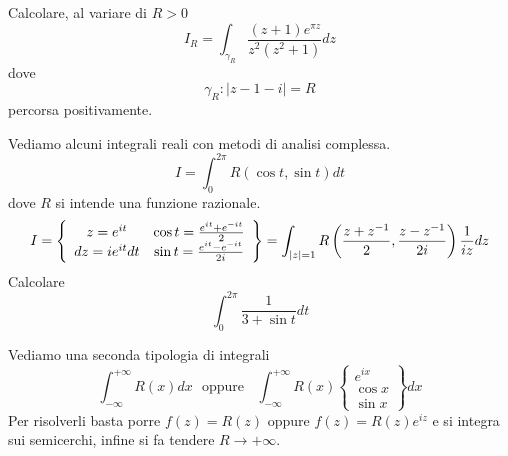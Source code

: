 Calcolare, al variare di $R > 0$
\begin{equation*}
I_{R} = \int _{\gamma _{R}}\frac{\left(z + 1\right) e^{\pi z}}{z^{2}\left(z^{2} + 1\right)} dz
\end{equation*}
dove
\begin{equation*}
\gamma _{R} :\left| z - 1 - i\right| = R
\end{equation*}
percorsa positivamente.
\Esercizio{}

Vediamo alcuni integrali reali con metodi di analisi complessa.
\begin{equation*}
I = \boxed{\int ^{2\pi }_{0} R\left(\cos t,\sin t\right) dt}
\end{equation*}
dove $R$ si intende una funzione razionale.
\begin{equation*}
I = \left\{\begin{array}{ c c }
z = e^{it} & \cos t = \frac{e^{it} + e^{ - it}}{2}\\
dz = ie^{it} dt & \sin t = \frac{e^{it} - e^{ - it}}{2i}
\end{array}\right\} = \int _{\left| z\right| = 1} R\left(\frac{z + z^{ - 1}}{2} ,\frac{z - z^{ - 1}}{2i}\right)\frac{1}{iz} dz
\end{equation*}
Calcolare
\begin{equation*}
\int ^{2\pi }_{0}\frac{1}{3 + \sin t} dt
\end{equation*}
\Esercizio{}

Vediamo una seconda tipologia di integrali
\begin{equation*}
\boxed{\int ^{ + \infty }_{ - \infty } R\left(x\right) dx} \ \ \ \text{oppure} \ \ \ \ \boxed{\int ^{ + \infty }_{ - \infty } R\left(x\right)\left\{\begin{array}{ c }
e^{ix}\\
\cos x\\
\sin x
\end{array}\right\} dx}
\end{equation*}
Per risolverli basta porre $f\left(z\right) = R\left(z\right)$ oppure $f\left(z\right) = R\left(z\right) e^{iz}$ e si integra sui semicerchi, infine si fa tendere $R\rightarrow + \infty $.

